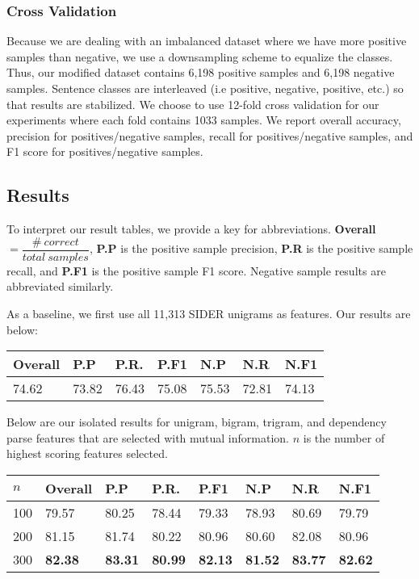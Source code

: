 \documentclass{acm_proc_article-sp}
\begin{document}
\subsubsection{Cross Validation}
Because we are dealing with an imbalanced dataset where we have more positive samples than negative, we use a downsampling scheme to equalize the classes. Thus, our modified dataset contains 6,198 positive samples and 6,198 negative samples. Sentence classes are interleaved (i.e positive, negative, positive, etc.) so that results are stabilized. We choose to use 12-fold cross validation for our experiments where each fold contains 1033 samples.
We report overall accuracy, precision for positives/negative samples, recall for positives/negative samples, and F1 score for positives/negative samples. 

\subsection{Results}
To interpret our result tables, we provide a key for abbreviations. \textbf{Overall} $= \dfrac{\#\:correct}{total\:samples}$, \textbf{P.P} is the positive sample precision, \textbf{P.R} is the positive sample recall, and \textbf{P.F1} is the positive sample F1 score. Negative sample results are abbreviated similarly. 

As a baseline, we first use all 11,313 SIDER unigrams as features. Our results are below:

\vspace{-3mm}
\tabcolsep=0.11cm
\begin{tabular}{| l | l | l | l | l | l | l |}
\hline
Overall & P.P & P.R. & P.F1 & N.P & N.R & N.F1 \\ \hline
74.62 & 73.82 & 76.43 & 75.08 & 75.53 & 72.81 & 74.13 \\ \hline
\end{tabular} 

Below are our isolated results for unigram, bigram, trigram, and dependency parse features that are selected with mutual information. $n$ is the number of highest scoring features selected. 
\vspace{-3mm}
\tabcolsep=0.11cm
\begin{tabular}{| l | l | l | l | l | l | l | l |}
\hline
$n$ & Overall & P.P & P.R. & P.F1 & N.P & N.R & N.F1 \\ \hline
100 & 79.57 & 80.25 & 78.44 & 79.33 & 78.93 & 80.69 & 79.79 \\ \hline
200 & 81.15 & 81.74 & 80.22 & 80.96 & 80.60 & 82.08 & 80.96 \\ \hline
300 & \bf{82.38} & \bf{83.31} & \bf{80.99} & \bf{82.13} & \bf{81.52} & \bf{83.77} & \bf{82.62} \\ \hline
\end{tabular} 
\end{document}
